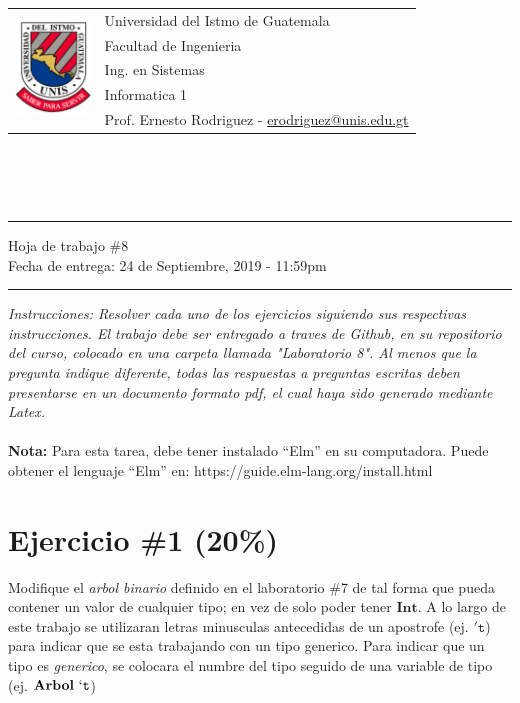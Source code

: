 \documentclass{article}
\newcommand{\horrule}[1]{\rule{\linewidth}{#1}}
\begin{document}
\begin{tabular}{l l}
\multirow{5}{*}{\includegraphics[width=2cm]{../../recursos/logo.png}}
 & Universidad del Istmo de Guatemala \\
 & Facultad de Ingenieria \\
 & Ing. en Sistemas \\
 & Informatica 1 \\
 & Prof. Ernesto Rodriguez - \href{mailto:erodriguez@unis.edu.gt}{erodriguez@unis.edu.gt} \\
\end{tabular}
\\\\\\

\begin{center}
        \horrule{0.5pt}
        \huge{Hoja de trabajo \#8} \\
        \large{Fecha de entrega: 24 de Septiembre, 2019 - 11:59pm} \\
        \horrule{1pt}
\end{center}

\emph{Instrucciones: Resolver cada uno de los ejercicios siguiendo sus respectivas
instrucciones. El trabajo debe ser entregado a traves de Github, en su repositorio del curso, colocado en una
carpeta llamada "Laboratorio 8". Al menos que la pregunta indique diferente, todas las
respuestas a preguntas escritas deben presentarse en un documento formato pdf, el cual
haya sido generado mediante Latex. }\\\\

{\bf Nota: } Para esta tarea, debe tener instalado ``Elm'' en su computadora. Puede obtener
el lenguaje ``Elm'' en: https://guide.elm-lang.org/install.html

\section*{Ejercicio \#1 (20\%)}

Modifique el \emph{arbol binario} definido en el laboratorio \#7 de tal
forma que pueda contener un valor de cualquier tipo; en vez de solo
poder tener $\mathbf{Int}$. A lo largo de este trabajo se utilizaran
letras minusculas antecedidas de un apostrofe (ej. $\mathtt{'t}$) para indicar que se
esta trabajando con un tipo generico. Para indicar que un tipo es \emph{generico},
se colocara el numbre del tipo seguido de una variable de tipo (ej. $\mathbf{Arbol}\ \mathtt{`t}$)
\end{document}
